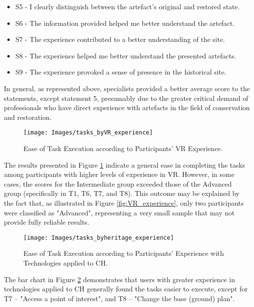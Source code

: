 \begin{itemize}
  \item S5 - I clearly distinguish between the artefact's original and restored state.
  \item S6 - The information provided helped me better understand the artefact.
  \item S7 - The experience contributed to a better understanding of the site.
  \item S8 - The experience helped me better understand the presented artefacts.
  \item S9 - The experience provoked a sense of presence in the historical site.
\end{itemize}

In general, as represented above, specialists provided a better average score to the statements, except statement 5, presumably due to the greater critical demand of professionals who have direct experience with artefacts in the field of conservation and restoration.

\begin{figure}[h!]
     \centering
     \texttt{[image: Images/tasks\_byVR\_experience]}
     \caption{Ease of Task Execution according to Participants’ \gls{VR} Experience.} 
     \label{fig:tasks_byVR_experience}
 \end{figure}

The results presented in Figure \ref{fig:tasks_byVR_experience} indicate a general ease in completing the tasks among participants with higher levels of experience in \gls{VR}. 
However, in some cases, the scores for the Intermediate group exceeded those of the Advanced group (specifically in T1, T6, T7, and T8). 
This outcome may be explained by the fact that, as illustrated in Figure \ref{fig:VR_experience}, only two participants were classified as "Advanced", representing a very small sample that may not provide fully reliable results.

\begin{figure}[h!]
    \centering
    \texttt{[image: Images/tasks\_byheritage\_experience]}
    \caption{Ease of Task Execution according to Participants’ Experience with Technologies applied to \gls{CH}.} 
    \label{fig:tasks_byheritage_experience}
\end{figure}

The bar chart in Figure \ref{fig:tasks_byheritage_experience} demonstrates that users with greater experience in technologies applied to \gls{CH} generally found the tasks easier to execute, except for T7 – "Access a point of interest", and T8 – "Change the base (ground) plan".

